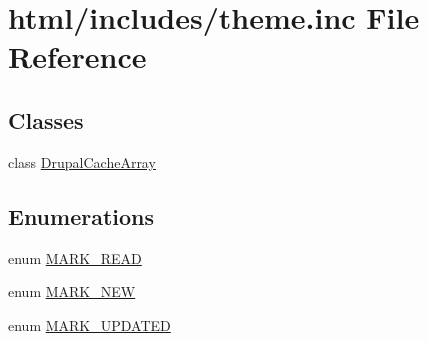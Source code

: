 \hypertarget{includes_2theme_8inc}{
\section{html/includes/theme.inc File Reference}
\label{includes_2theme_8inc}
}
\subsection*{Classes}
\begin{DoxyCompactItemize}
\item 
class \hyperlink{classDrupalCacheArray}{DrupalCacheArray}
\end{DoxyCompactItemize}
\subsection*{Enumerations}
\begin{DoxyCompactItemize}
\item 
enum \hyperlink{group__content__flags_ga72684c074c0ade1909bad72841c48614}{MARK\_\-READ} 
\item 
enum \hyperlink{group__content__flags_ga44d42cbfa50b553ad2439e19478d0d3d}{MARK\_\-NEW} 
\item 
enum \hyperlink{group__content__flags_ga6e9f0d9282433b9f08f025aaca43e1fe}{MARK\_\-UPDATED} 
\end{DoxyCompactItemize}
